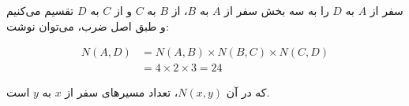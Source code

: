 \p
سفر از
$A$
به
$D$
را به سه بخش سفر از
$A$
به
$B$،
از
$B$
به
$C$
و از
$C$
به
$D$
تقسیم می‌کنیم و طبق اصل ضرب، می‌توان نوشت:

\begin{align*}
    N(A,D) &= N(A,B) \times N(B,C) \times N(C,D)\\
    &= 4 \times 2 \times 3 = 24
\end{align*}

که در آن
$N(x,y)$،
تعداد مسیر‌های سفر از $x$ به $y$ است.
